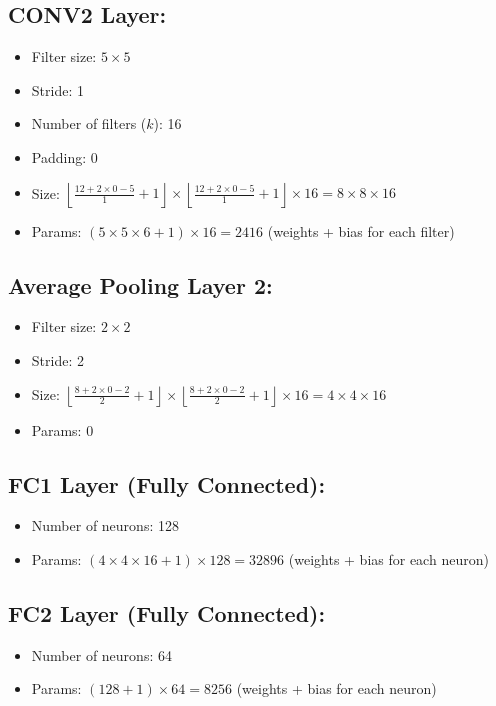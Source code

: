 \documentclass{article}
\begin{document}
\begin{latin}
\subsection*{CONV2 Layer:}
\begin{itemize}
    \item Filter size: $5 \times 5$
    \item Stride: 1
    \item Number of filters ($k$): 16
    \item Padding: 0
    \item Size: $\left\lfloor \frac{12 + 2 \times 0 - 5}{1} + 1 \right\rfloor \times \left\lfloor \frac{12 + 2 \times 0 - 5}{1} + 1 \right\rfloor \times 16 = 8 \times 8 \times 16$
    \item Params: $(5 \times 5 \times 6 + 1) \times 16 = 2416$ (weights + bias for each filter)
\end{itemize}

\subsection*{Average Pooling Layer 2:}
\begin{itemize}
    \item Filter size: $2 \times 2$
    \item Stride: 2
    \item Size: $\left\lfloor \frac{8 + 2 \times 0 - 2}{2} + 1 \right\rfloor \times \left\lfloor \frac{8 + 2 \times 0 - 2}{2} + 1 \right\rfloor \times 16 = 4 \times 4 \times 16$
    \item Params: $0$
\end{itemize}

\subsection*{FC1 Layer (Fully Connected):}
\begin{itemize}
    \item Number of neurons: 128
    \item Params: $(4 \times 4 \times 16 + 1) \times 128 = 32896$ (weights + bias for each neuron)
\end{itemize}

\subsection*{FC2 Layer (Fully Connected):}
\begin{itemize}
    \item Number of neurons: 64
    \item Params: $(128 + 1) \times 64 = 8256$ (weights + bias for each neuron)
\end{itemize}


\end{latin}
\end{document}

